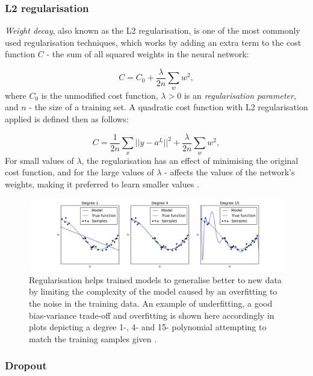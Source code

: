 \subsubsection{L2 regularisation}

\emph{Weight decay}, also known as the L2 regularisation, is one of the most commonly used regularisation techniques, which works by adding an extra term to the cost function $C$ - the sum of all squared weights in the neural network:

\begin{equation}
C = C_0 + \frac{\lambda}{2n} \sum_w w^2,
\end{equation}
where $C_0$ is the unmodified cost function, $\lambda > 0$ is an \emph{regularisation parameter}, and $n$ - the size of a training set. A quadratic cost function with L2 regularisation applied is defined then as follows: 

\begin{equation}
C = \frac{1}{2n} \sum_x ||y - a^L||^2 + \frac{\lambda}{2n} \sum_w w^2,
\end{equation}
For small values of $\lambda$, the regularisation has an effect of minimising the original cost function, and for the large values of $\lambda$ - affects the values of the network's weights, making it preferred to learn smaller values \cite{backpropagation_nielsen}.

\begin{figure}[]
\centering
\includegraphics[scale=0.48]{figures/regularisation.png}
\caption{Regularisation helps trained models to generalise better to new data by limiting the complexity of the model caused by an overfitting to the noise in the training data. An example of underfitting, a good bias-variance trade-off and overfitting is shown here accordingly in plots depicting a degree 1-, 4- and 15- polynomial attempting to match the training samples given \cite{regularisation_scikit}.}
\end{figure}

\subsubsection{Dropout}

